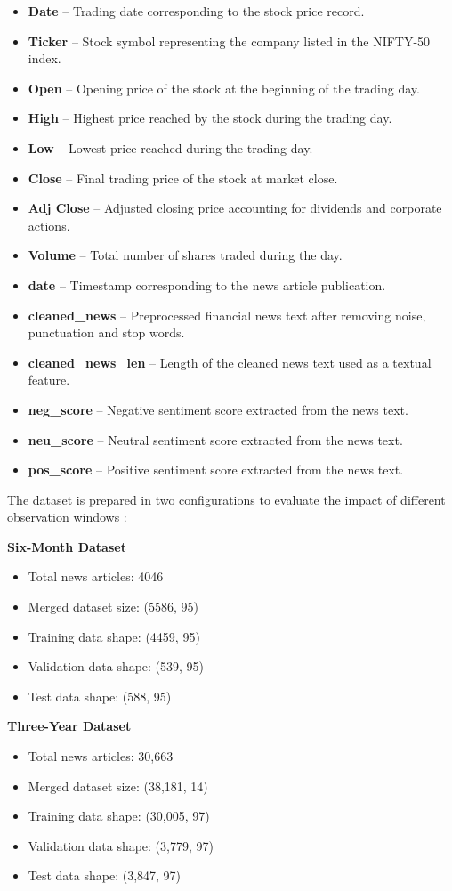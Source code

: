 \documentclass[11pt]{article}
\begin{document}
\begin{itemize}
\item \textbf{Date} – Trading date corresponding to the stock price record.
\item \textbf{Ticker} – Stock symbol representing the company listed in the NIFTY-50 index.
\item \textbf{Open} – Opening price of the stock at the beginning of the trading day.
\item \textbf{High} – Highest price reached by the stock during the trading day.
\item \textbf{Low} – Lowest price reached during the trading day.
\item \textbf{Close} – Final trading price of the stock at market close.
\item \textbf{Adj Close} – Adjusted closing price accounting for dividends and corporate actions.
\item \textbf{Volume} – Total number of shares traded during the day.
\item \textbf{date} – Timestamp corresponding to the news article publication.
\item \textbf{cleaned\_news} – Preprocessed financial news text after removing noise, punctuation and stop words.
\item \textbf{cleaned\_news\_len} – Length of the cleaned news text used as a textual feature.
\item \textbf{neg\_score} – Negative sentiment score extracted from the news text.
\item \textbf{neu\_score} – Neutral sentiment score extracted from the news text.
\item \textbf{pos\_score} – Positive sentiment score extracted from the news text.
\end{itemize}

The dataset is prepared in two configurations to evaluate the impact of different observation windows :

\textbf{Six-Month Dataset}
\begin{itemize}
\item Total news articles: 4046
\item Merged dataset size: (5586, 95)
\item Training data shape: (4459, 95)
\item Validation data shape: (539, 95)
\item Test data shape: (588, 95)
\end{itemize}

\textbf{Three-Year Dataset}
\begin{itemize}
\item Total news articles: 30,663
\item Merged dataset size: (38,181, 14)
\item Training data shape: (30,005, 97)
\item Validation data shape: (3,779, 97)
\item Test data shape: (3,847, 97)
\end{itemize}
\end{document}
